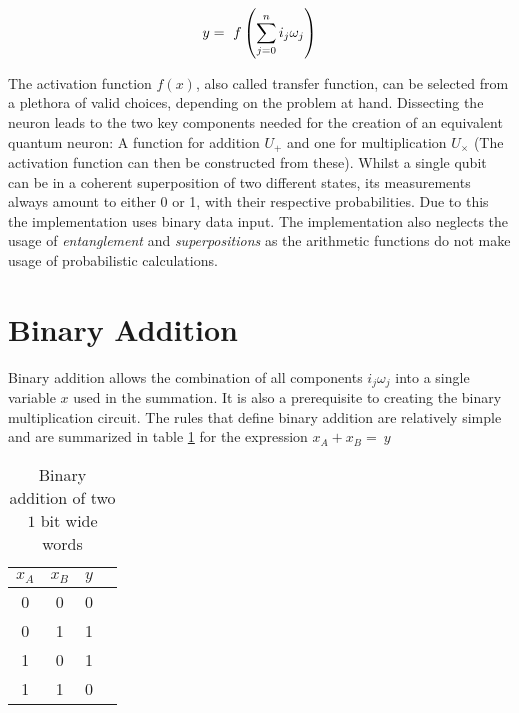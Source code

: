 \begin{equation}
    \centering
    y =\ f\left(\sum_{j = 0}^n i_j\omega_j\right)
    \label{equation:computation_neuron}
\end{equation}

\newpage

The activation function $f(x)$, also called transfer function, can be selected from a plethora of valid choices\cite{szandala_review_2021}, depending on the problem at hand. Dissecting the neuron leads to the two key components needed for the creation of an equivalent quantum neuron: A function for addition $U_{+}$ and one for multiplication $U_{\times}$ (The activation function can then be constructed from these). Whilst a single qubit can be in a coherent superposition of two different states\cite{nielsen_quantum_2010}, its measurements always amount to either 0 or 1, with their respective probabilities. Due to this the implementation uses binary data input. The implementation also neglects the usage of \emph{entanglement} and \emph{superpositions} as the arithmetic functions do not make usage of probabilistic calculations.

\section{Binary Addition}\label{chapter:binary_addition}

Binary addition allows the combination of all components $i_j\omega_j$ into a single variable $x$ used in the summation. It is also a prerequisite to creating the binary multiplication circuit. The rules that define binary addition are relatively simple and are summarized in table \ref{table:binary_addition_rules} for the expression $x_A + x_B =\ y$\\
\begin{table}[!h]
\centering
\begin{tabular}{|c|c|c|c|}
\hline
$x_A$ & $x_B$ & $y$ \\ \hline
0    & 0    & 0  \\ \hline
0    & 1    & 1  \\ \hline
1    & 0    & 1  \\ \hline
1    & 1    & 0  \\ \hline
\end{tabular}
\caption{Binary addition of two $1$ bit wide words}
\label{table:binary_addition_rules}
\end{table}

